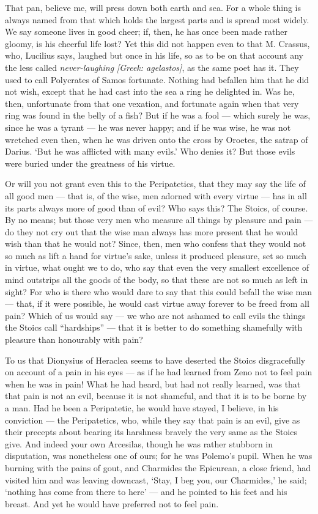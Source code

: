  That pan, believe me, will press down both earth and sea. For a whole thing is always named from that which holds the largest parts and is spread most widely. We say someone lives in good cheer; if, then, he has once been made rather gloomy, is his cheerful life lost? Yet this did not happen even to that M. Crassus, who, Lucilius says, laughed but once in his life, so as to be on that account any the less called \textit{never-laughing} \textit{[Greek: agelastos]}, as the same poet has it. They used to call Polycrates of Samos fortunate. Nothing had befallen him that he did not wish, except that he had cast into the sea a ring he delighted in. Was he, then, unfortunate from that one vexation, and fortunate again when that very ring was found in the belly of a fish? But if he was a fool — which surely he was, since he was a tyrant — he was never happy; and if he was wise, he was not wretched even then, when he was driven onto the cross by Oroetes, the satrap of Darius. ‘But he was afflicted with many evils.’ Who denies it? But those evils were buried under the greatness of his virtue.

 Or will you not grant even this to the Peripatetics, that they may say the life of all good men — that is, of the wise, men adorned with every virtue — has in all its parts always more of good than of evil? Who says this? The Stoics, of course. By no means; but those very men who measure all things by pleasure and pain — do they not cry out that the wise man always has more present that he would wish than that he would not? Since, then, men who confess that they would not so much as lift a hand for virtue’s sake, unless it produced pleasure, set so much in virtue, what ought we to do, who say that even the very smallest excellence of mind outstrips all the goods of the body, so that these are not so much as left in sight? For who is there who would dare to say that this could befall the wise man — that, if it were possible, he would cast virtue away forever to be freed from all pain? Which of us would say — we who are not ashamed to call evils the things the Stoics call “hardships” — that it is better to do something shamefully with pleasure than honourably with pain?

 To us that Dionysius of Heraclea seems to have deserted the Stoics disgracefully on account of a pain in his eyes — as if he had learned from Zeno not to feel pain when he was in pain! What he had heard, but had not really learned, was that that pain is not an evil, because it is not shameful, and that it is to be borne by a man. Had he been a Peripatetic, he would have stayed, I believe, in his conviction — the Peripatetics, who, while they say that pain is an evil, give as their precepts about bearing its harshness bravely the very same as the Stoics give. And indeed your own Arcesilas, though he was rather stubborn in disputation, was nonetheless one of ours; for he was Polemo’s pupil. When he was burning with the pains of gout, and Charmides the Epicurean, a close friend, had visited him and was leaving downcast, ‘Stay, I beg you, our Charmides,’ he said; ‘nothing has come from there to here’ — and he pointed to his feet and his breast. And yet he would have preferred not to feel pain.

